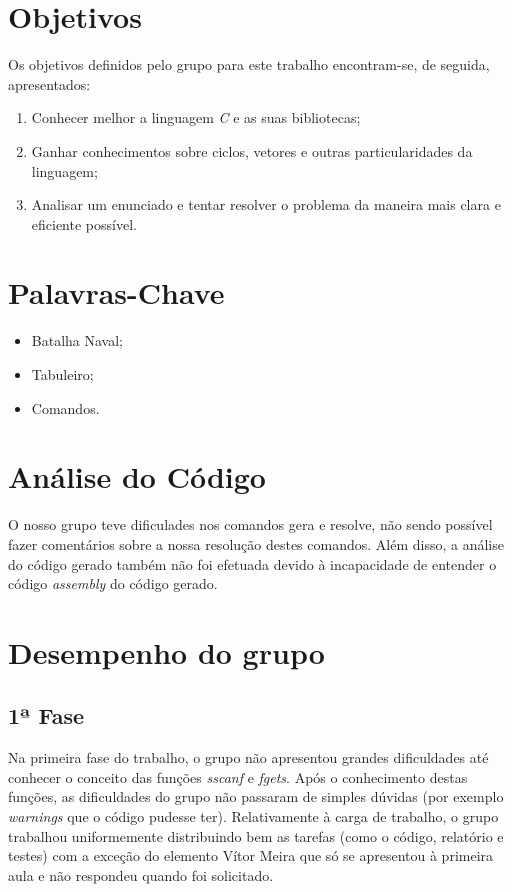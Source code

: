 \documentclass[a4paper,12pt,portuges]{article}
\begin{document}
\newpage


\section{Objetivos}

Os objetivos definidos pelo grupo para este trabalho encontram-se, de seguida, apresentados:

\begin{enumerate}
\item Conhecer melhor a linguagem \textit{C} e as suas bibliotecas;
\item Ganhar conhecimentos sobre ciclos, vetores e outras particularidades da linguagem; 
\item Analisar um enunciado e tentar resolver o problema da maneira mais clara e eficiente possível.
\end{enumerate}

\section {Palavras-Chave}

\begin{itemize}
\item Batalha Naval;
\item Tabuleiro;
\item Comandos.
\end{itemize}

\newpage

\section{Análise do Código}

O nosso grupo teve dificulades nos comandos gera e resolve, não sendo possível fazer comentários sobre a nossa resolução destes comandos.
Além disso, a análise do código gerado também não foi efetuada devido à incapacidade de entender o código \textit{assembly} do código gerado.

\newpage

\section{Desempenho do grupo}

\subsection{1ª Fase}

Na primeira fase do trabalho, o grupo não apresentou grandes dificuldades até conhecer o conceito das funções \textit{sscanf} e \textit{fgets}. Após o conhecimento destas funções, as dificuldades do grupo não passaram de simples dúvidas (por exemplo \textit{warnings} que o código pudesse ter). Relativamente à carga de trabalho, o grupo trabalhou uniformemente distribuindo bem as tarefas (como o código, relatório e testes) com a exceção do elemento Vítor Meira que só se apresentou à primeira aula e não respondeu quando foi solicitado.
\end{document}
